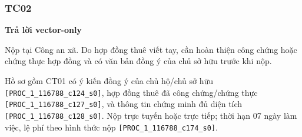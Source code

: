 \documentclass[11pt,a4paper]{article}
\newcommand{\src}[1]{\texttt{#1}}
\begin{document}
\subsubsection*{TC02}
\textbf{Trả lời vector-only}\par\nobreak
\begin{answerbox}
Nộp tại Công an xã. Do hợp đồng thuê viết tay, cần hoàn thiện công chứng hoặc chứng thực hợp đồng và có văn bản đồng ý của chủ sở hữu trước khi nộp.

Hồ sơ gồm CT01 có ý kiến đồng ý của chủ hộ/chủ sở hữu \src{[PROC\_1\_116788\_c124\_s0]}, hợp đồng thuê đã công chứng/chứng thực \src{[PROC\_1\_116788\_c127\_s0]}, và thông tin chứng minh đủ diện tích \src{[PROC\_1\_116788\_c128\_s0]}. Nộp trực tuyến hoặc trực tiếp; thời hạn 07 ngày làm việc, lệ phí theo hình thức nộp \src{[PROC\_1\_116788\_c174\_s0]}.
\end{answerbox}
\end{document}
